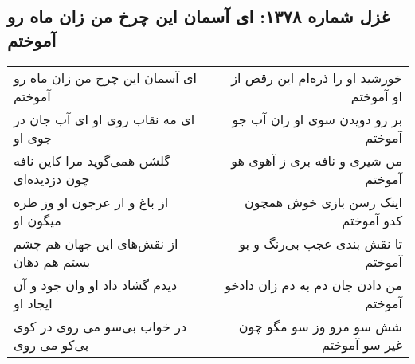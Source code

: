 \begin{center}
\section*{غزل شماره ۱۳۷۸: ای آسمان این چرخ من زان ماه رو آموختم}
\label{sec:1378}
\begin{longtable}{l p{0.5cm} r}
ای آسمان این چرخ من زان ماه رو آموختم
&&
خورشید او را ذره‌ام این رقص از او آموختم
\\
ای مه نقاب روی او ای آب جان در جوی او
&&
بر رو دویدن سوی او زان آب جو آموختم
\\
گلشن همی‌گوید مرا کاین نافه چون دزدیده‌ای
&&
من شیری و نافه بری ز آهوی هو آموختم
\\
از باغ و از عرجون او وز طره میگون او
&&
اینک رسن بازی خوش همچون کدو آموختم
\\
از نقش‌های این جهان هم چشم بستم هم دهان
&&
تا نقش بندی عجب بی‌رنگ و بو آموختم
\\
دیدم گشاد داد او وان جود و آن ایجاد او
&&
من دادن جان دم به دم زان دادخو آموختم
\\
در خواب بی‌سو می روی در کوی بی‌کو می روی
&&
شش سو مرو وز سو مگو چون غیر سو آموختم
\\
\end{longtable}
\end{center}
